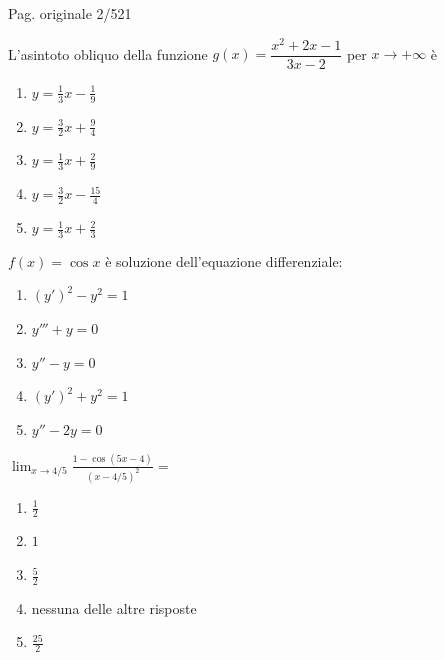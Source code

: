 \par\noindent\hfill{\color{cyan!65!black}\scriptsize Pag. originale 2/521}\par\smallskip
\begin{quiz}
L'asintoto obliquo della funzione $g(x)=\dfrac{x^2+2x-1}{3x-2}$ per $x\to+\infty$ \`e
\begin{enumerate}[label=\alph*),leftmargin=1.3cm,itemsep=3pt,topsep=5pt]\item $y=\frac13x-\frac19$\item $y=\frac32x+\frac94$\item $y=\frac13x+\frac29$\item $y=\frac32x-\frac{15}4$\item $y=\frac13x+\frac23$\end{enumerate}
\end{quiz}

\begin{quiz}
$f(x)=\cos x$ \`e soluzione dell'equazione differenziale:
\begin{enumerate}[label=\alph*),leftmargin=1.3cm,itemsep=3pt,topsep=5pt]\item $(y')^2-y^2=1$\item $y'''+y=0$\item $y''-y=0$\item $(y')^2+y^2=1$\item $y''-2y=0$\end{enumerate}
\end{quiz}

\begin{quiz}
$\displaystyle\lim_{x\to4/5}\frac{1-\cos(5x-4)}{(x-4/5)^2}=$
\begin{enumerate}[label=\alph*),leftmargin=1.3cm,itemsep=3pt,topsep=5pt]\item $\frac12$\item $1$\item $\frac52$\item nessuna delle altre risposte\item $\frac{25}2$\end{enumerate}
\end{quiz}

